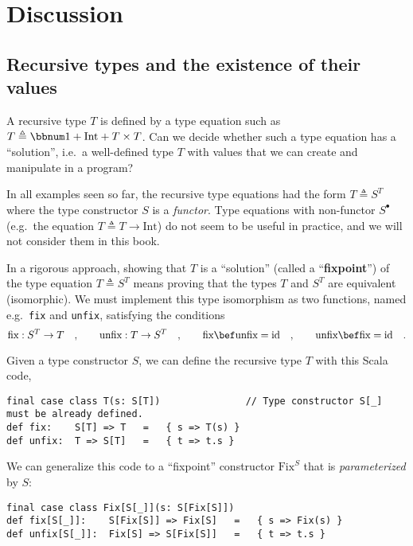\section{Discussion}

\subsection{Recursive types and the existence of their values\label{subsec:Recursive-types-and-the-existence-of-their-values}}

A recursive type $T$ is defined by a type equation such as $T\triangleq\bbnum 1+\text{Int}+T\times T$.
Can we decide whether such a type equation has a ``solution'', i.e.~a
well-defined type $T$ with values that we can create and manipulate
in a program?

In all examples seen so far, the recursive type equations had the
form $T\triangleq S^{T}$ where the type constructor $S$ is a \emph{functor}.
Type equations with non-functor $S^{\bullet}$ (e.g.~the equation
$T\triangleq T\rightarrow\text{Int}$) do not seem to be useful in
practice, and we will not consider them in this book.

In a rigorous approach, showing that $T$ is a ``solution'' (called
a ``\textbf{fixpoint}'') of the type equation
$T\triangleq S^{T}$ means proving that the types $T$ and $S^{T}$
are equivalent (isomorphic). We must implement this type isomorphism
as two functions, named e.g.~\lstinline!fix! and \lstinline!unfix!,
satisfying the conditions 
\[
\text{fix}:S^{T}\rightarrow T\quad,\quad\quad\text{unfix}:T\rightarrow S^{T}\quad,\quad\quad\text{fix}\bef\text{unfix}=\text{id}\quad,\quad\quad\text{unfix}\bef\text{fix}=\text{id}\quad.
\]

Given a type constructor $S$, we can define the recursive type $T$
with this Scala code,
\begin{lstlisting}
final case class T(s: S[T])               // Type constructor S[_] must be already defined.
def fix:    S[T] => T   =   { s => T(s) }
def unfix:  T => S[T]   =   { t => t.s }
\end{lstlisting}
We can generalize this code to a ``fixpoint'' constructor $\text{Fix}^{S}$
that is \emph{parameterized} by $S$:
\begin{lstlisting}
final case class Fix[S[_]](s: S[Fix[S]])
def fix[S[_]]:    S[Fix[S]] => Fix[S]   =   { s => Fix(s) }
def unfix[S[_]]:  Fix[S] => S[Fix[S]]   =   { t => t.s }
\end{lstlisting}

